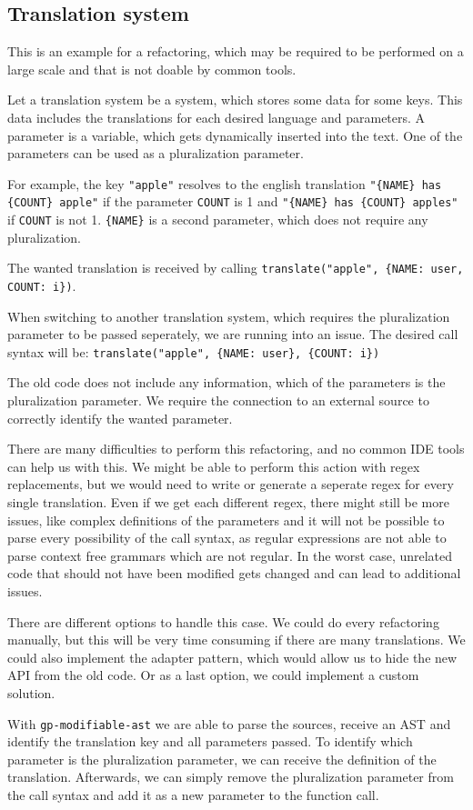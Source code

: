 
\subsection{Translation system}

This is an example for a refactoring, which may be required to be performed on a large scale and that is not doable by common tools.

Let a translation system be a system, which stores some data for some keys. This data includes the translations for each desired language and parameters.
A parameter is a variable, which gets dynamically inserted into the text. One of the parameters can be used as a pluralization parameter.

For example, the key \verb|"apple"| resolves to the english translation \verb|"{NAME} has {COUNT} apple"| if the parameter \lstinline|COUNT| is 1 
and \verb|"{NAME} has {COUNT} apples"| if \lstinline|COUNT| is not 1.
\lstinline|{NAME}| is a second parameter, which does not require any pluralization.

The wanted translation is received by calling \lstinline|translate("apple", {NAME: user, COUNT: i})|.


When switching to another translation system, which requires the pluralization parameter to be passed seperately, we are running into an issue. 
The desired call syntax will be: \lstinline|translate("apple", {NAME: user}, {COUNT: i})|

The old code does not include any information, which of the parameters is the pluralization parameter. 
We require the connection to an external source to correctly identify the wanted parameter.

There are many difficulties to perform this refactoring, and no common IDE tools can help us with this.
We might be able to perform this action with regex replacements, but we would need to write or generate a seperate regex for every single translation.
Even if we get each different regex, there might still be more issues, like complex definitions of the parameters and it will not be possible to 
parse every possibility of the call syntax, as regular expressions are not able to parse context free grammars which are not regular.
In the worst case, unrelated code that should not have been modified gets changed and can lead to additional issues.

There are different options to handle this case. We could do every refactoring manually, but this will be very time consuming if there are many translations.
We could also implement the adapter pattern, which would allow us to hide the new API from the old code. Or as a last option, we could implement a custom solution.

With \verb|gp-modifiable-ast| we are able to parse the sources, receive an AST and identify the translation key and all parameters passed.
To identify which parameter is the pluralization parameter, we can receive the definition of the translation. Afterwards, 
we can simply remove the pluralization parameter
from the call syntax and add it as a new parameter to the function call.